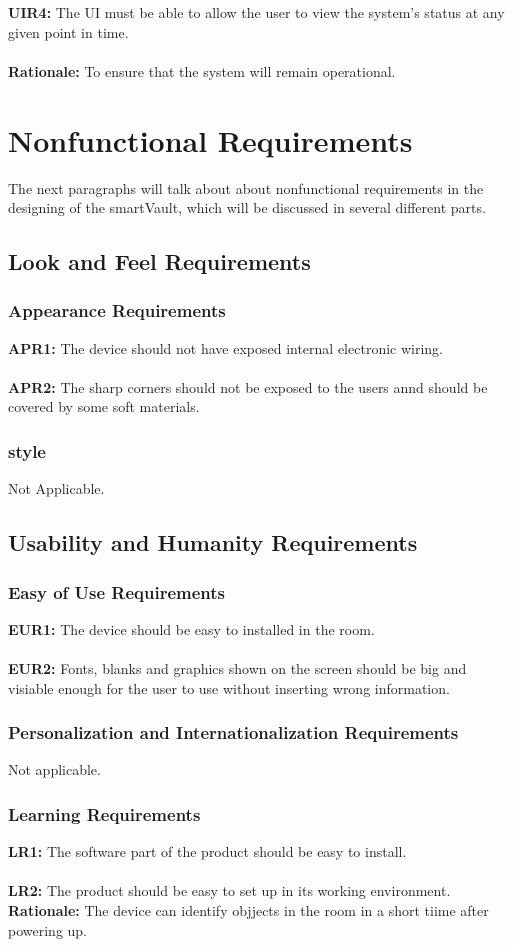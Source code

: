 \documentclass[12pt]{article}
\begin{document}
\textbf{UIR4:} The UI must be able to allow the user to view the system’s status at any given point in time.\\\\
\textbf{Rationale:} To ensure that the system will remain operational.


\section{Nonfunctional Requirements}
The next paragraphs will talk about about nonfunctional requirements in the designing of the smartVault, which will be discussed in several different parts. 
\subsection{Look and Feel Requirements}
\subsubsection{Appearance Requirements}
\textbf{APR1:} The device should not have exposed internal electronic wiring.\\\\
\textbf{APR2:} The sharp corners should not be exposed to the users annd should be covered by some soft materials.
\subsubsection{style}
Not Applicable.
\subsection{Usability and Humanity Requirements}
\subsubsection{Easy of Use Requirements}
\textbf{EUR1:} The device should be easy to installed in the room.\\\\
\textbf{EUR2:} Fonts, blanks and graphics shown on the screen should be big and visiable enough for the user to use without inserting wrong information.
\subsubsection{Personalization and Internationalization Requirements}
Not applicable.
\subsubsection{Learning Requirements}
\textbf{LR1:} The software part of the product should be easy to install.\\\\
\textbf{LR2:} The product should be easy to set up in its working environment.\\
\textbf{Rationale:} The device can identify objjects in the room in a short tiime after powering up.
\end{document}

